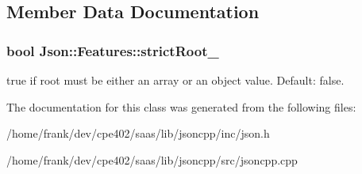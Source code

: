 \subsection{Member Data Documentation}
\hypertarget{class_json_1_1_features_a1162c37a1458adc32582b585b552f9c3}{}
\subsubsection[{strict\+Root\+\_\+}]{\setlength{\rightskip}{0pt plus 5cm}bool Json\+::\+Features\+::strict\+Root\+\_\+}\label{class_json_1_1_features_a1162c37a1458adc32582b585b552f9c3}
{\ttfamily true} if root must be either an array or an object value. Default\+: {\ttfamily false}. 

The documentation for this class was generated from the following files\+:\begin{DoxyCompactItemize}
\item 
/home/frank/dev/cpe402/saas/lib/jsoncpp/inc/json.\+h\item 
/home/frank/dev/cpe402/saas/lib/jsoncpp/src/jsoncpp.\+cpp\end{DoxyCompactItemize}
